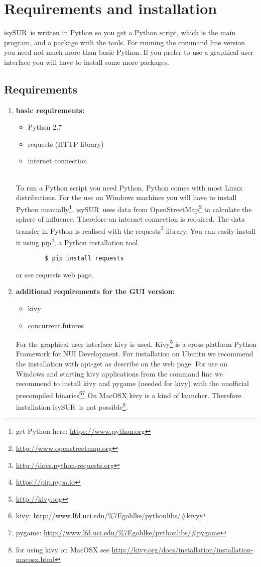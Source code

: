 \documentclass[11pt,fleqn]{book} %
\newcommand{\ProjectTitle}{isySUR}
\newcommand{\pt}{\ProjectTitle}
\begin{document}
\section{Requirements and installation}\label{sec:installation}
\pt\ is written in Python so you get a Python script, which is the main program, and a package with the tools. For running the command line version you need not much more than basic Python. If you prefer to use a graphical user interface you will have to install some more packages.
\subsection{Requirements}\label{sec:requirements}
\begin{enumerate}
	\item \textbf{basic requirements:}
	\begin{itemize}
		\item Python 2.7
		\item requests (HTTP library)
		\item internet connection
	\end{itemize}
	~\\
	To run a Python script you need Python. Python comes with most Linux distributions. For the use on Windows machines you will have to install Python manually\footnote{get Python here: \url{https://www.python.org}}. \pt\ uses data from OpenStreetMap\footnote{\url{http://www.openstreetmap.org}} to calculate the sphere of influence. Therefore an internet connection is required. The data transfer in Python is realised with the requests\footnote{\url{http://docs.python-requests.org}\label{fn:requests}} library. You can easily install it using pip\footnote{\url{https://pip.pypa.io}}, a Python installation tool
	\begin{verbatim}
		$ pip install requests
	\end{verbatim}
	or see requests web page.
	\newpage
	\item \textbf{additional requirements for the GUI version:}
	\begin{itemize}
		\item kivy
		\item concurrent.futures
	\end{itemize}
	For the graphical user interface kivy is used. Kivy\footnote{\url{http://kivy.org}} is a cross-platform Python Framework for NUI Development. For installation on Ubuntu we recommend the installation with apt-get as describe on the web page. For use on Windows and starting kivy applications from the command line we recommend to install kivy and pygame (needed for kivy) with the unofficial precompiled binaries\footnote{kivy: \url{http://www.lfd.uci.edu/\%7Egohlke/pythonlibs/\#kivy}}\footnote{pygame: \url{http://www.lfd.uci.edu/\%7Egohlke/pythonlibs/\#pygame}} On MacOSX kivy is a kind of launcher. Therefore installation \pt\ is not possible\footnote{for using kivy on MacOSX see \url{http://kivy.org/docs/installation/installation-macosx.html}}.
	

\end{enumerate}
\end{document}
